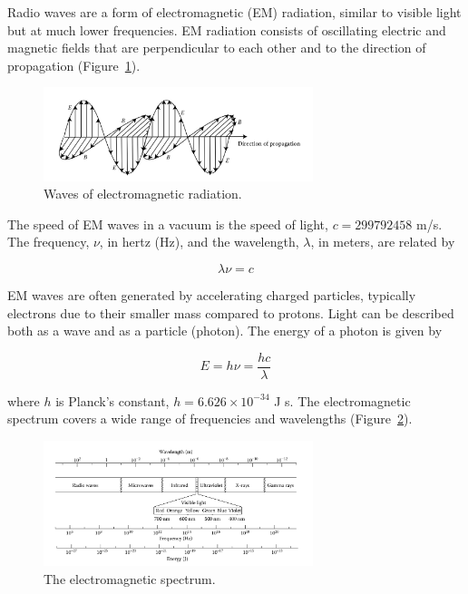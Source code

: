 Radio waves are a form of electromagnetic (EM) radiation, similar to visible light but at much lower frequencies. EM radiation consists of oscillating electric and magnetic fields that are perpendicular to each other and to the direction of propagation (Figure~\ref{fig:em_waves}).

\begin{figure}[H]
    \centering
    \includegraphics[width=0.7\textwidth]{Images/em_waves.png}
    \caption{Waves of electromagnetic radiation.}
    \label{fig:em_waves}
\end{figure}

The speed of EM waves in a vacuum is the speed of light, $c = 299 792 458$ m/s. The frequency, $\nu$, in hertz (Hz), and the wavelength, $\lambda$, in meters, are related by

\begin{equation}
    \lambda \nu = c
\end{equation}

EM waves are often generated by accelerating charged particles, typically electrons due to their smaller mass compared to protons. Light can be described both as a wave and as a particle (photon). The energy of a photon is given by

\begin{equation}
    E = h\nu = \frac{hc}{\lambda}
\end{equation}

where $h$ is Planck’s constant, $h = 6.626 \times 10^{-34}$ J s. The electromagnetic spectrum covers a wide range of frequencies and wavelengths (Figure~\ref{fig:em_spectrum}).

\begin{figure}[H]
    \centering
    \includegraphics[width=0.7\textwidth]{Images/em_spectrum.png}
    \caption{The electromagnetic spectrum.}
    \label{fig:em_spectrum}
\end{figure}

